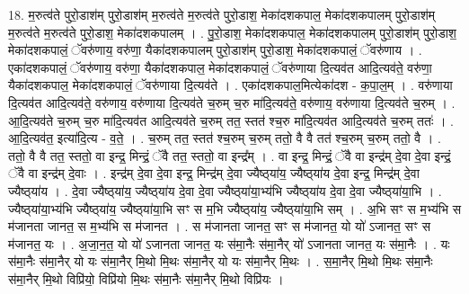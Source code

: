 \documentclass[17pt]{extarticle}
\begin{document}
18. म॒रुत्व॑ते पुरो॒डाश॑म् पुरो॒डाश॑म् म॒रुत्व॑ते म॒रुत्व॑ते पुरो॒डाश॒ मेका॑दशकपाल॒ मेका॑दशकपालम् पुरो॒डाश॑म् म॒रुत्व॑ते म॒रुत्व॑ते पुरो॒डाश॒ मेका॑दशकपालम् । . पु॒रो॒डाश॒ मेका॑दशकपाल॒ मेका॑दशकपालम् पुरो॒डाश॑म् पुरो॒डाश॒ मेका॑दशकपालं॒ ॅवरु॑णाय॒ वरु॑णा॒ यैका॑दशकपालम् पुरो॒डाश॑म् पुरो॒डाश॒ मेका॑दशकपालं॒ ॅवरु॑णाय । . एका॑दशकपालं॒ ॅवरु॑णाय॒ वरु॑णा॒ यैका॑दशकपाल॒ मेका॑दशकपालं॒ ॅवरु॑णाया दि॒त्यव॑त आदि॒त्यव॑ते॒ वरु॑णा॒ यैका॑दशकपाल॒ मेका॑दशकपालं॒ ॅवरु॑णाया दि॒त्यव॑ते । . एका॑दशकपाल॒मित्येका॑दश - क॒पा॒ल॒म् । . वरु॑णाया दि॒त्यव॑त आदि॒त्यव॑ते॒ वरु॑णाय॒ वरु॑णाया दि॒त्यव॑ते च॒रुम् च॒रु मा॑दि॒त्यव॑ते॒ वरु॑णाय॒ वरु॑णाया दि॒त्यव॑ते च॒रुम् । . आ॒दि॒त्यव॑ते च॒रुम् च॒रु मा॑दि॒त्यव॑त आदि॒त्यव॑ते च॒रुम् तत॒ स्तत॑ श्च॒रु मा॑दि॒त्यव॑त आदि॒त्यव॑ते च॒रुम् ततः॑ । . आ॒दि॒त्यव॑त॒ इत्या॑दि॒त्य - व॒ते॒ । . च॒रुम् तत॒ स्तत॑ श्च॒रुम् च॒रुम् ततो॒ वै वै तत॑ श्च॒रुम् च॒रुम् ततो॒ वै । . ततो॒ वै वै तत॒ स्ततो॒ वा इन्द्र॒ मिन्द्रं॒ ॅवै तत॒ स्ततो॒ वा इन्द्र᳚म् । . वा इन्द्र॒ मिन्द्रं॒ ॅवै वा इन्द्र॑म् दे॒वा दे॒वा इन्द्रं॒ ॅवै वा इन्द्र॑म् दे॒वाः । . इन्द्र॑म् दे॒वा दे॒वा इन्द्र॒ मिन्द्र॑म् दे॒वा ज्यैष्ठ्‍या॑य॒ ज्यैष्ठ्‍या॑य दे॒वा इन्द्र॒ मिन्द्र॑म् दे॒वा ज्यैष्ठ्‍या॑य । . दे॒वा ज्यैष्ठ्‍या॑य॒ ज्यैष्ठ्‍या॑य दे॒वा दे॒वा ज्यैष्ठ्‍या॑या॒भ्य॑भि ज्यैष्ठ्‍या॑य दे॒वा दे॒वा ज्यैष्ठ्‍या॑या॒भि । . ज्यैष्ठ्‍या॑या॒भ्य॑भि ज्यैष्ठ्‍या॑य॒ ज्यैष्ठ्‍या॑या॒भि सꣳ स म॒भि ज्यैष्ठ्‍या॑य॒ ज्यैष्ठ्‍या॑या॒भि सम् । . अ॒भि सꣳ स म॒भ्य॑भि स म॑जानता जानत॒ स म॒भ्य॑भि स म॑जानत । . स म॑जानता जानत॒ सꣳ स म॑जानत॒ यो यो॑ ऽजानत॒ सꣳ स म॑जानत॒ यः । . अ॒जा॒न॒त॒ यो यो॑ ऽजानता जानत॒ यः स॑मा॒नैः स॑मा॒नैर् यो॑ ऽजानता जानत॒ यः स॑मा॒नैः । . यः स॑मा॒नैः स॑मा॒नैर् यो यः स॑मा॒नैर् मि॒थो मि॒थः स॑मा॒नैर् यो यः स॑मा॒नैर् मि॒थः । . स॒मा॒नैर् मि॒थो मि॒थः स॑मा॒नैः स॑मा॒नैर् मि॒थो विप्रि॑यो॒ विप्रि॑यो मि॒थः स॑मा॒नैः स॑मा॒नैर् मि॒थो विप्रि॑यः । \newline
\end{document}
